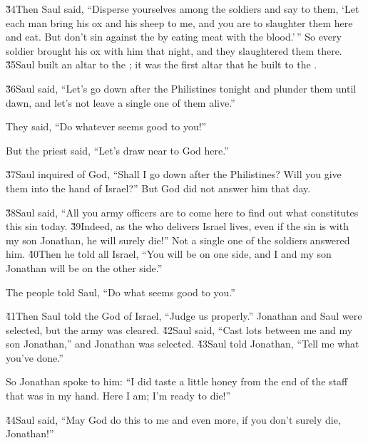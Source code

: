 \v{34}Then Saul said, ``Disperse yourselves among the soldiers and say to them, `Let each man bring his ox and his sheep to me, and you are to slaughter them here and eat. But don't sin against the  by eating meat with the blood.'\,'' So every soldier brought his ox with him that night, and they slaughtered them there. \v{35}Saul built an altar to the ; it was the first altar that he built to the .

\v{36}Saul said, ``Let's go down after the Philistines tonight and plunder them until dawn, and let's not leave a single one of them alive.''

They said, ``Do whatever seems good to you!''

But the priest said, ``Let's draw near to God here.''

\v{37}Saul inquired of God, ``Shall I go down after the Philistines? Will you give them into the hand of Israel?'' But God did not answer him that day.

\v{38}Saul said, ``All you army officers are to come here to find out what constitutes this sin today. \v{39}Indeed, as the  who delivers Israel lives, even if the sin is with my son Jonathan, he will surely die!'' Not a single one of the soldiers answered him. \v{40}Then he told all Israel, ``You will be on one side, and I and my son Jonathan will be on the other side.''

The people told Saul, ``Do what seems good to you.''

\v{41}Then Saul told the  God of Israel, ``Judge us properly.'' Jonathan and Saul were selected, but the army was cleared. \v{42}Saul said, ``Cast lots between me and my son Jonathan,'' and Jonathan was selected. \v{43}Saul told Jonathan, ``Tell me what you've done.''

So Jonathan spoke to him: ``I did taste a little honey from the end of the staff that was in my hand. Here I am; I'm ready to die!''

\v{44}Saul said, ``May God do this to me and even more, if you don't surely die, Jonathan!''

